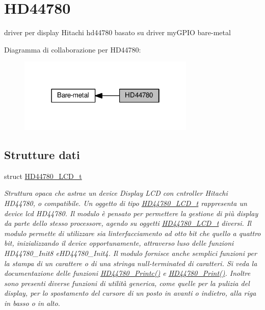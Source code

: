 \hypertarget{group___h_d44780}{}\section{H\+D44780}
\label{group___h_d44780}


driver per display Hitachi hd44780 basato su driver my\+G\+P\+IO bare-\/metal  


Diagramma di collaborazione per H\+D44780\+:\nopagebreak
\begin{figure}[H]
\begin{center}
\leavevmode
\includegraphics[width=238pt]{group___h_d44780}
\end{center}
\end{figure}
\subsection*{Strutture dati}
\begin{DoxyCompactItemize}
\item 
struct \hyperlink{struct_h_d44780___l_c_d__t}{H\+D44780\+\_\+\+L\+C\+D\+\_\+t}
\begin{DoxyCompactList}\small\item\em Struttura opaca che astrae un device Display L\+CD con cntroller Hitachi H\+D44780, o compatibile. Un oggetto di tipo \hyperlink{struct_h_d44780___l_c_d__t}{H\+D44780\+\_\+\+L\+C\+D\+\_\+t} rappresenta un device lcd H\+D44780. Il modulo è pensato per permettere la gestione di più display da parte dello stesso processore, agendo su oggetti \hyperlink{struct_h_d44780___l_c_d__t}{H\+D44780\+\_\+\+L\+C\+D\+\_\+t} diversi. Il modulo permette di utilizzare sia l\textquotesingle{}interfacciamento ad otto bit che quello a quattro bit, inizializzando il device opportunamente, attraverso l\textquotesingle{}uso delle funzioni H\+D44780\+\_\+\+Init8 e\+H\+D44780\+\_\+\+Init4. Il modulo fornisce anche semplici funzioni per la stampa di un carattere o di una stringa null-\/terminated di caratteri. Si veda la documentazione delle funzioni \hyperlink{group___h_d44780_ga57b8c6ca0b3c12e5f7273b3c373a6f17}{H\+D44780\+\_\+\+Printc()} e \hyperlink{group___h_d44780_ga3aedff8e2040e62db569fde955d3987b}{H\+D44780\+\_\+\+Print()}. Inoltre sono presenti diverse funzioni di utilità generica, come quelle per la pulizia del display, per lo spostamento del cursore di un posto in avanti o indietro, alla riga in basso o in alto. \end{DoxyCompactList}\end{DoxyCompactItemize}
